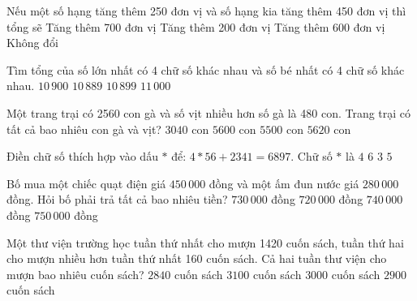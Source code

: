 \begin{ex} %
Nếu một số hạng tăng thêm 250 đơn vị và số hạng kia tăng thêm 450 đơn vị thì tổng sẽ
\choice
{\True Tăng thêm 700 đơn vị}
{Tăng thêm 200 đơn vị}
{Tăng thêm 600 đơn vị}
{Không đổi}
\end{ex}

\begin{ex} %
Tìm tổng của số lớn nhất có 4 chữ số khác nhau và số bé nhất có 4 chữ số khác nhau.
\choice
{$10\,900$}
{$10\,889$}
{\True $10\,899$}
{$11\,000$}
\end{ex}

\begin{ex} %
Một trang trại có 2560 con gà và số vịt nhiều hơn số gà là 480 con. Trang trại có tất cả bao nhiêu con gà và vịt?
\choice
{$3040$ con}
{\True $5600$ con}
{$5500$ con}
{$5620$ con}
\end{ex}

\begin{ex} %
Điền chữ số thích hợp vào dấu $*$ để: $4*56 + 2341 = 6897$. Chữ số $*$ là
\choice
{$4$}
{$6$}
{$3$}
{\True $5$}
\end{ex}

\begin{ex} %
Bố mua một chiếc quạt điện giá $450\,000$ đồng và một ấm đun nước giá $280\,000$ đồng. Hỏi bố phải trả tất cả bao nhiêu tiền?
\choice
{\True $730\,000$ đồng}
{$720\,000$ đồng}
{$740\,000$ đồng}
{$750\,000$ đồng}
\end{ex}

\begin{ex} %
Một thư viện trường học tuần thứ nhất cho mượn 1420 cuốn sách, tuần thứ hai cho mượn nhiều hơn tuần thứ nhất 160 cuốn sách. Cả hai tuần thư viện cho mượn bao nhiêu cuốn sách?
\choice
{$2840$ cuốn sách}
{$3100$ cuốn sách}
{\True $3000$ cuốn sách}
{$2900$ cuốn sách}
\end{ex}

